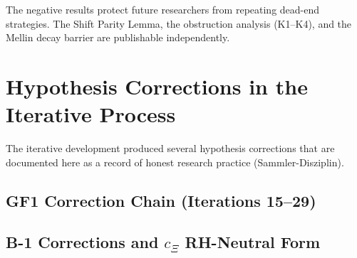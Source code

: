\documentclass[12pt,a4paper]{article}
\theoremstyle{definition}
\theoremstyle{remark}
\begin{document}
\noindent The negative results protect future researchers from repeating
dead-end strategies. The Shift Parity Lemma, the obstruction analysis
(K1--K4), and the Mellin decay barrier are publishable independently.


\section{Hypothesis Corrections in the Iterative Process}
\label{sec:sammler-disziplin}

The iterative development produced several hypothesis corrections that
are documented here as a record of honest research practice
(Sammler-Disziplin).

\subsection{GF1 Correction Chain (Iterations 15--29)}

\begin{center}
\renewcommand{\arraystretch}{1.2}
\end{center}


\subsection{\texorpdfstring{B-1 Corrections and $c_\Xi$ RH-Neutral Form}{B-1 Corrections and cXi RH-Neutral Form}}
\end{document}
